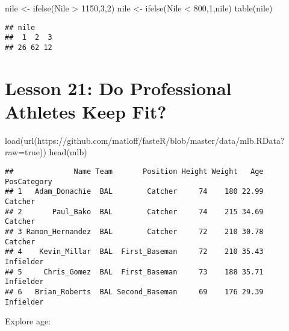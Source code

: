 \documentclass[
]{article}
\newenvironment{Shaded}{\begin{snugshade}}{\end{snugshade}}
\newcommand{\DecValTok}[1]{\textcolor[rgb]{0.00,0.00,0.81}{#1}}
\newcommand{\FunctionTok}[1]{\textcolor[rgb]{0.00,0.00,0.00}{#1}}
\newcommand{\NormalTok}[1]{#1}
\newcommand{\OtherTok}[1]{\textcolor[rgb]{0.56,0.35,0.01}{#1}}
\newcommand{\SpecialCharTok}[1]{\textcolor[rgb]{0.00,0.00,0.00}{#1}}
\newcommand{\StringTok}[1]{\textcolor[rgb]{0.31,0.60,0.02}{#1}}
\begin{document}
\begin{Shaded}
\begin{Highlighting}[]
\NormalTok{nile }\OtherTok{\textless{}{-}} \FunctionTok{ifelse}\NormalTok{(Nile }\SpecialCharTok{\textgreater{}} \DecValTok{1150}\NormalTok{,}\DecValTok{3}\NormalTok{,}\DecValTok{2}\NormalTok{)}
\NormalTok{nile }\OtherTok{\textless{}{-}} \FunctionTok{ifelse}\NormalTok{(Nile }\SpecialCharTok{\textless{}} \DecValTok{800}\NormalTok{,}\DecValTok{1}\NormalTok{,nile)}
\FunctionTok{table}\NormalTok{(nile)}
\end{Highlighting}
\end{Shaded}

\begin{verbatim}
## nile
##  1  2  3 
## 26 62 12
\end{verbatim}

\hypertarget{lesson-21-do-professional-athletes-keep-fit}{%
\section{Lesson 21: Do Professional Athletes Keep
Fit?}\label{lesson-21-do-professional-athletes-keep-fit}}

\begin{Shaded}
\begin{Highlighting}[]
\FunctionTok{load}\NormalTok{(}\FunctionTok{url}\NormalTok{(}\StringTok{\textquotesingle{}https://github.com/matloff/fasteR/blob/master/data/mlb.RData?raw=true\textquotesingle{}}\NormalTok{))}
\FunctionTok{head}\NormalTok{(mlb)}
\end{Highlighting}
\end{Shaded}

\begin{verbatim}
##              Name Team       Position Height Weight   Age PosCategory
## 1   Adam_Donachie  BAL        Catcher     74    180 22.99     Catcher
## 2       Paul_Bako  BAL        Catcher     74    215 34.69     Catcher
## 3 Ramon_Hernandez  BAL        Catcher     72    210 30.78     Catcher
## 4    Kevin_Millar  BAL  First_Baseman     72    210 35.43   Infielder
## 5     Chris_Gomez  BAL  First_Baseman     73    188 35.71   Infielder
## 6   Brian_Roberts  BAL Second_Baseman     69    176 29.39   Infielder
\end{verbatim}

Explore age:

\begin{Shaded}
\end{Shaded}
\end{document}
